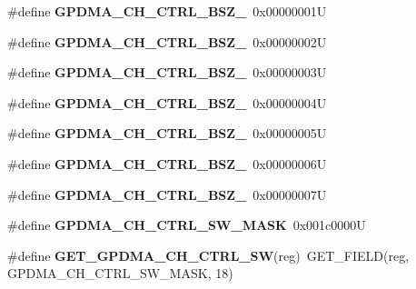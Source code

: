 \begin{DoxyCompactItemize}
\item 
\mbox{\label{group__lpc24xx__regs_gac4c481fa08d7be0b3aac4f9efcbc7bad}} 
\#define {\bfseries G\+P\+D\+M\+A\+\_\+\+C\+H\+\_\+\+C\+T\+R\+L\+\_\+\+B\+S\+Z\+\_}~0x00000001U
\item 
\mbox{\label{group__lpc24xx__regs_gab767b555992c14628847de4fd7fce670}} 
\#define {\bfseries G\+P\+D\+M\+A\+\_\+\+C\+H\+\_\+\+C\+T\+R\+L\+\_\+\+B\+S\+Z\+\_}~0x00000002U
\item 
\mbox{\label{group__lpc24xx__regs_ga5977fe44cf5b8d0027cecf963631022b}} 
\#define {\bfseries G\+P\+D\+M\+A\+\_\+\+C\+H\+\_\+\+C\+T\+R\+L\+\_\+\+B\+S\+Z\+\_}~0x00000003U
\item 
\mbox{\label{group__lpc24xx__regs_gae9c843f61b650a60ccbe7fdae5986fbd}} 
\#define {\bfseries G\+P\+D\+M\+A\+\_\+\+C\+H\+\_\+\+C\+T\+R\+L\+\_\+\+B\+S\+Z\+\_}~0x00000004U
\item 
\mbox{\label{group__lpc24xx__regs_ga48c2872dc35a9ddda3f81ffc243f383b}} 
\#define {\bfseries G\+P\+D\+M\+A\+\_\+\+C\+H\+\_\+\+C\+T\+R\+L\+\_\+\+B\+S\+Z\+\_}~0x00000005U
\item 
\mbox{\label{group__lpc24xx__regs_gad4a3a209d44ba31841fe33d571357278}} 
\#define {\bfseries G\+P\+D\+M\+A\+\_\+\+C\+H\+\_\+\+C\+T\+R\+L\+\_\+\+B\+S\+Z\+\_}~0x00000006U
\item 
\mbox{\label{group__lpc24xx__regs_gae59c367a1080a9107ce99893847a0331}} 
\#define {\bfseries G\+P\+D\+M\+A\+\_\+\+C\+H\+\_\+\+C\+T\+R\+L\+\_\+\+B\+S\+Z\+\_}~0x00000007U
\item 
\mbox{\label{group__lpc24xx__regs_gacc94eb2275cfc96447d2705c9597cd95}} 
\#define {\bfseries G\+P\+D\+M\+A\+\_\+\+C\+H\+\_\+\+C\+T\+R\+L\+\_\+\+S\+W\+\_\+\+M\+A\+SK}~0x001c0000U
\item 
\mbox{\label{group__lpc24xx__regs_gad88a41345000825b58b8a1caa848f02d}} 
\#define {\bfseries G\+E\+T\+\_\+\+G\+P\+D\+M\+A\+\_\+\+C\+H\+\_\+\+C\+T\+R\+L\+\_\+\+SW}(reg)~G\+E\+T\+\_\+\+F\+I\+E\+LD(reg, G\+P\+D\+M\+A\+\_\+\+C\+H\+\_\+\+C\+T\+R\+L\+\_\+\+S\+W\+\_\+\+M\+A\+SK, 18)

\end{DoxyCompactItemize}
